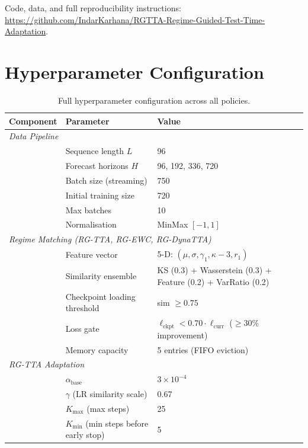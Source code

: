 \documentclass[journal]{IEEEtran}
\newcommand{\repourl}{\url{https://github.com/IndarKarhana/RGTTA-Regime-Guided-Test-Time-Adaptation}}
\begin{document}
Code, data, and full reproducibility instructions: \repourl.




\appendix

\section{Hyperparameter Configuration}
\label{app:hyperparams}

\begin{table}[t]
\centering
\caption{Full hyperparameter configuration across all policies.}
\label{tab:hyperparams}
\small
\begin{tabular}{lll}
\toprule
Component & Parameter & Value \\
\midrule
\multicolumn{3}{l}{\emph{Data Pipeline}} \\
& Sequence length $L$ & 96 \\
& Forecast horizons $H$ & 96, 192, 336, 720 \\
& Batch size (streaming) & 750 \\
& Initial training size & 720 \\
& Max batches & 10 \\
& Normalisation & MinMax $[-1, 1]$ \\
\midrule
\multicolumn{3}{l}{\emph{Regime Matching (RG-TTA, RG-EWC, RG-DynaTTA)}} \\
& Feature vector & 5-D: $(\mu, \sigma, \gamma_1, \kappa{-}3, r_1)$ \\
& Similarity ensemble & KS (0.3) + Wasserstein (0.3) + Feature (0.2) + VarRatio (0.2) \\
& Checkpoint loading threshold & sim $\geq 0.75$ \\
& Loss gate & $\ell_{\text{ckpt}} < 0.70 \cdot \ell_{\text{curr}}$ ($\geq$30\% improvement) \\
& Memory capacity & 5 entries (FIFO eviction) \\
\midrule
\multicolumn{3}{l}{\emph{RG-TTA Adaptation}} \\
& $\alpha_{\text{base}}$ & $3 \times 10^{-4}$ \\
& $\gamma$ (LR similarity scale) & 0.67 \\
& $K_{\max}$ (max steps) & 25 \\
& $K_{\min}$ (min steps before early stop) & 5 \\

\end{tabular}
\end{table}
\end{document}
